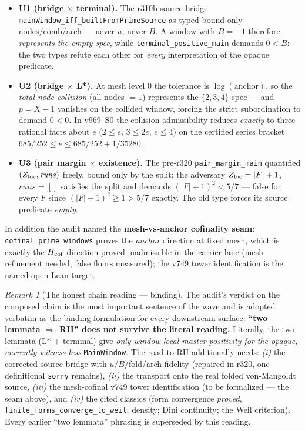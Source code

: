 \documentclass[11pt]{article}
\theoremstyle{definition}
\theoremstyle{remark}
\newtheorem{remark}[theorem]{Remark}
\begin{document}
\begin{itemize}[leftmargin=2em]
\item \textbf{U1 (bridge $\times$ terminal).}  The r310b source
bridge \texttt{mainWindow\_iff\_builtFromPrimeSource} as typed bound
only nodes/comb/arch --- never $u$, never $B$.  A window with
$B = -1$ therefore \emph{represents the empty spec}, while
\texttt{terminal\_positive\_main} demands $0 < B$: the two types
refute each other for \emph{every} interpretation of the opaque
predicate.
\item \textbf{U2 (bridge $\times$ L*).}  At mesh level 0 the
tolerance is $\log(\mathrm{anchor})$, so the \emph{total node
collision} (all nodes $= 1$) represents the $\{2,3,4\}$ spec ---
and $p = X - 1$ vanishes on the collided window, forcing the strict
subordination to demand $0 < 0$.  In v969~S0 the collision
admissibility reduces \emph{exactly} to three rational facts about
$e$ ($2 \le e$, $3 \le 2e$, $e \le 4$) on the certified series
bracket $685/252 \le e \le 685/252 + 1/35280$.
\item \textbf{U3 (pair margin $\times$ existence).}  The pre-r320
\texttt{pair\_margin\_main} quantified $(Z_{\rm loc},
\mathit{runs})$ freely, bound only by the split; the adversary
$Z_{\rm loc} = |F| + 1$, $\mathit{runs} = []$ satisfies the split
and demands $(|F| + 1)^2 < 5/7$ --- false for every $F$ since
$(|F| + 1)^2 \ge 1 > 5/7$ exactly.  The old type forces its source
predicate \emph{empty}.
\end{itemize}

\noindent In addition the audit named the \textbf{mesh-vs-anchor
cofinality seam}: \texttt{cofinal\_prime\_windows} proves the
\emph{anchor} direction at fixed mesh, which is exactly the
$H_{\rm cof}$ direction proved inadmissible in the carrier lane
(mesh refinement needed, false floors measured); the v749 tower
identification is the named open Lean target.

\begin{remark}[The honest chain reading --- binding]
\label{rem:honestchain}
The audit's verdict on the composed claim is the most important
sentence of the wave and is adopted verbatim as the binding
formulation for every downstream surface: \textbf{``two lemmata
$\Rightarrow$ RH'' does not survive the literal reading.}  Literally,
the two lemmata (L* $+$ terminal) give \emph{only window-local
master positivity for the opaque, currently witness-less}
\texttt{MainWindow}.  The road to RH additionally needs:
\emph{(i)} the corrected source bridge with $u$/$B$/fold/arch
fidelity (repaired in r320, one definitional \texttt{sorry}
remains), \emph{(ii)} the transport onto the real folded von-Mangoldt
source, \emph{(iii)} the mesh-cofinal v749 tower identification (to
be formalized --- the seam above), and \emph{(iv)} the cited
classics (form convergence \emph{proved},
\texttt{finite\_forms\_converge\_to\_weil}; density; Dini
continuity; the Weil criterion).  Every earlier ``two lemmata''
phrasing is superseded by this reading.
\end{remark}
\end{document}
